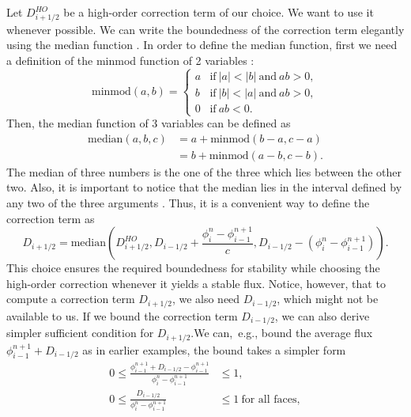 \documentclass[../thesis.tex]{subfiles}
\begin{document}
Let \(D_{i+1/2}^{HO}\) be a high-order correction term of our choice. We want to use it whenever possible.
We can write the boundedness of the correction term elegantly using the median function \cite{1989_Huynh_CONF}.
In order to define the median function, first we need a definition of the minmod function of 2 variables \cite{2002_LeVeque_BOOK}:
\begin{equation}
    \mbox{minmod}(a,b) =
    \begin{cases}
        a & \text{if}\ |a| < |b|\ \text{and}\ ab > 0, \\
        b & \text{if}\ |b| < |a|\ \text{and}\ ab > 0, \\
        0 & \text{if}\ ab < 0.
    \end{cases}
\end{equation}
Then, the median function of 3 variables can be defined as \cite{1989_Huynh_CONF}
\begin{equation}
    \begin{split}
        \mbox{median}(a,b,c)
        &= a + \mbox{minmod}\left( b - a, c - a \right)
        \\
        &= b + \mbox{minmod}\left( a - b, c - b \right).
    \end{split}
\end{equation}
The median of three numbers is the one of the three which lies between the other two. Also, it is important to notice that the median lies in the interval defined by any two of the three arguments \cite{1989_Huynh_CONF}. Thus, it is a convenient way to define the correction term as
\begin{equation}
    D_{i+1/2} = \mbox{median}\left(
        D_{i+1/2}^{HO},
        D_{i-1/2} + \frac{\phi_{i}^{n} - \phi_{i-1}^{n+1}}{c},
        D_{i-1/2} - (\phi_{i}^{n} - \phi_{i-1}^{n+1})
    \right).
\end{equation}
This choice ensures the required boundedness for stability while choosing the high-order correction whenever it yields a stable flux.
Notice, however, that to compute a correction term \(D_{i+1/2}\), we also need \(D_{i-1/2}\), which might not be available to us.
If we bound the correction term \(D_{i-1/2}\), we can also derive simpler sufficient condition for \(D_{i+1/2}\).We can,~e.g., bound the average flux \(\phi_{i-1}^{n+1} + D_{i-1/2}\) as in earlier examples, the bound takes a simpler form
\begin{equation}
    \begin{split}
        0
        \leq
        \frac{\phi_{i-1}^{n+1} + D_{i-1/2} - \phi_{i-1}^{n+1}}
        {\phi_{i}^{n} - \phi_{i-1}^{n+1}}
        &\leq
        1,
        \\
        0
        \leq
        \frac{D_{i-1/2}}
        {\phi_{i}^{n} - \phi_{i-1}^{n+1}}
        &\leq
        1\
        \text{for all faces},
    \end{split}
\end{equation}
\end{document}
